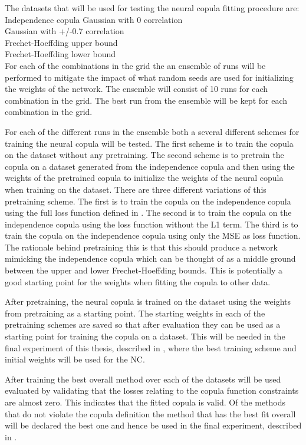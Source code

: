 The datasets that will be used for testing the neural copula fitting procedure are:\\ 
Independence copula Gaussian with 0 correlation\\
Gaussian with +/-0.7 correlation\\
Frechet-Hoeffding upper bound\\
Frechet-Hoeffding lower bound\\




For each of the combinations in the grid the an ensemble of runs will be performed to mitigate the impact of what random seeds are used for initializing the weights of the network. The ensemble will consist of 10 runs for each combination in the grid. The best run from the ensemble will be kept for each combination in the grid. 

For each of the different runs in the ensemble both a several different schemes for training the neural copula will be tested. The first scheme is to train the copula on the dataset without any pretraining. The second scheme is to pretrain the copula on a dataset generated from the independence copula and then using the weights of the pretrained copula to initialize the weights of the neural copula when training on the dataset. There are three different variations of this pretraining scheme. The first is to train the copula on the independence copula using the full loss function defined in . The second is to train the copula on the independence copula using the loss function without the L1 term. The third is to train the copula on the independence copula using only the MSE as loss function. The rationale behind pretraining this is that this should produce a network mimicking the independence copula which can be thought of as a middle ground between the upper and lower Frechet-Hoeffding bounds. This is potentially a good starting point for the weights when fitting the copula to other data.  

After pretraining, the neural copula is trained on the dataset using the weights from pretraining as a starting point. The starting weights in each of the pretraining schemes are saved so that after evaluation they can be used as a starting point for training the copula on a dataset. This will be needed in the final experiment of this thesis, described in , where the best training scheme and initial weights will be used for the \gls{NC}. 

After training the best overall method over each of the datasets will be used evaluated by validating that the losses relating to the copula function constraints are almost zero. This indicates that the fitted copula is valid. Of the methods that do not violate the copula definition the method that has the best fit overall will be declared the best one and hence be used in the final experiment, described in .  


